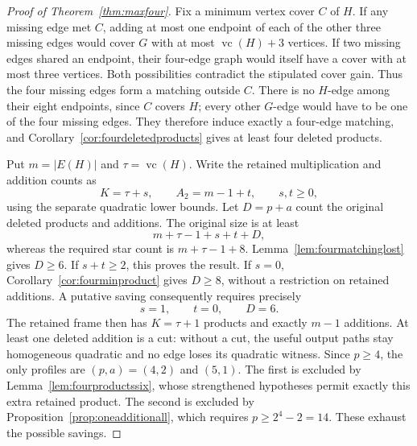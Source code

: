 \documentclass[11pt]{article}
\newcommand{\vc}{\operatorname{vc}}
\theoremstyle{definition}
\theoremstyle{remark}
\begin{document}
\begin{proof}[Proof of Theorem~\ref{thm:maxfour}]
Fix a minimum vertex cover $C$ of $H$. If any missing edge met $C$, adding at most one endpoint of each of the other three missing edges would cover $G$ with at most $\vc(H)+3$ vertices. If two missing edges shared an endpoint, their four-edge graph would itself have a cover with at most three vertices. Both possibilities contradict the stipulated cover gain. Thus the four missing edges form a matching outside $C$. There is no $H$-edge among their eight endpoints, since $C$ covers $H$; every other $G$-edge would have to be one of the four missing edges. They therefore induce exactly a four-edge matching, and Corollary~\ref{cor:fourdeletedproducts} gives at least four deleted products.

Put $m=|E(H)|$ and $\tau=\vc(H)$. Write the retained multiplication and addition counts as
\[
 K=\tau+s,\qquad A_2=m-1+t,\qquad s,t\ge0,
\]
using the separate quadratic lower bounds. Let $D=p+a$ count the original deleted products and additions. The original size is at least
\[
 m+\tau-1+s+t+D,
\]
whereas the required star count is $m+\tau-1+8$. Lemma~\ref{lem:fourmatchinglost} gives $D\ge6$. If $s+t\ge2$, this proves the result. If $s=0$, Corollary~\ref{cor:fourminproduct} gives $D\ge8$, without a restriction on retained additions. A putative saving consequently requires precisely
\[
 s=1,\qquad t=0,\qquad D=6.
\]
The retained frame then has $K=\tau+1$ products and exactly $m-1$ additions. At least one deleted addition is a cut: without a cut, the useful output paths stay homogeneous quadratic and no edge loses its quadratic witness. Since $p\ge4$, the only profiles are $(p,a)=(4,2)$ and $(5,1)$. The first is excluded by Lemma~\ref{lem:fourproductssix}, whose strengthened hypotheses permit exactly this extra retained product. The second is excluded by Proposition~\ref{prop:oneadditionall}, which requires $p\ge2^4-2=14$. These exhaust the possible savings.
\end{proof}
\end{document}

